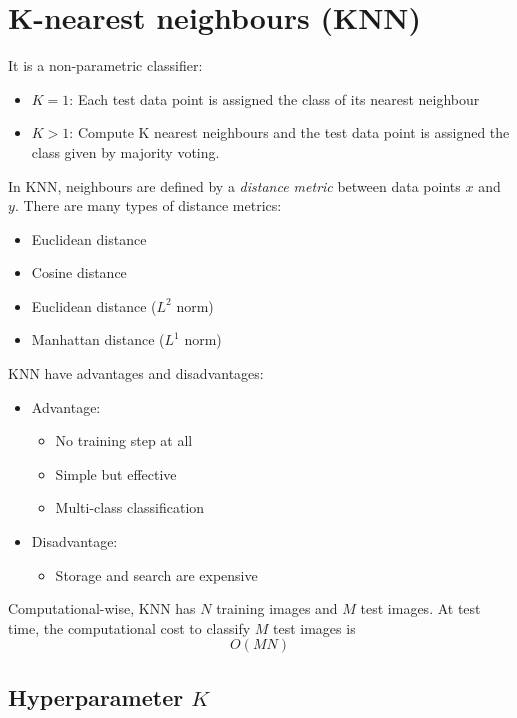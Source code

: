 \documentclass{report}
\begin{document}
\section{K-nearest neighbours (KNN)}

It is a non-parametric classifier:
\begin{itemize}
    \item $K=1$: Each test data point is assigned the class of its nearest neighbour
    \item $K>1$: Compute K nearest neighbours and the test data point is
    assigned the class given by majority voting.
\end{itemize}

In KNN, neighbours are defined by a \textit{distance metric} between data points
$x$ and $y$. There are many types of distance metrics:
\begin{itemize}
    \item Euclidean distance
    \item Cosine distance
    \item Euclidean distance ($L^2$ norm) 
    \item Manhattan distance ($L^1$ norm)
\end{itemize}

KNN have advantages and disadvantages:
\begin{itemize}
    \item Advantage:
    \begin{itemize}
        \item No training step at all
        \item Simple but effective
        \item Multi-class classification
    \end{itemize}

    \item Disadvantage:
    \begin{itemize}
        \item Storage and search are expensive
    \end{itemize}
\end{itemize}

Computational-wise, KNN has $N$ training images and $M$ test images. At test
time, the computational cost to classify $M$ test images is
$$
    O(MN)
$$

\subsection{Hyperparameter $K$}
\end{document}

